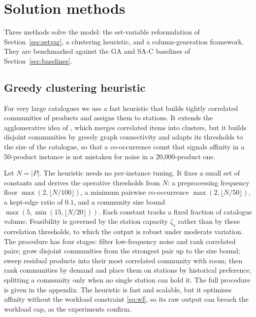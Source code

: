 \documentclass[]{interact}
\begin{document}
\section{Solution methods}\label{sec:methods}
Three methods solve the model: the set-variable reformulation of Section~\ref{sec:setvar}, a clustering heuristic, and a column-generation framework. They are benchmarked against the GA and SA-C baselines of Section~\ref{sec:baselines}.

\subsection{Greedy clustering heuristic}\label{sec:heuristic}
For very large catalogues we use a fast heuristic that builds tightly correlated communities of products and assigns them to stations. It extends the agglomerative idea of \citet{chuang2016}, which merges correlated items into clusters, but it builds disjoint communities by greedy graph connectivity \citep{west2001introduction} and adapts its thresholds to the size of the catalogue, so that a co-occurrence count that signals affinity in a 50-product instance is not mistaken for noise in a 20,000-product one.

Let $N = |P|$. The heuristic needs no per-instance tuning. It fixes a small set of constants and derives the operative thresholds from $N$: a preprocessing frequency floor $\max(2, \lfloor N/100 \rfloor)$, a minimum pairwise co-occurrence $\max(2, \lfloor N/50 \rfloor)$, a kept-edge ratio of $0.1$, and a community size bound $\max(5, \min(15, \lfloor N/20 \rfloor))$. Each constant tracks a fixed fraction of catalogue volume. Feasibility is governed by the station capacity $\zeta_s$ rather than by these correlation thresholds, to which the output is robust under moderate variation. The procedure has four stages: filter low-frequency noise and rank correlated pairs; grow disjoint communities from the strongest pair up to the size bound; sweep residual products into their most correlated community with room; then rank communities by demand and place them on stations by historical preference, splitting a community only when no single station can hold it. The full procedure is given in the appendix. The heuristic is fast and scalable, but it optimises affinity without the workload constraint \eqref{eq:wl}, so its raw output can breach the workload cap, as the experiments confirm.
\end{document}
